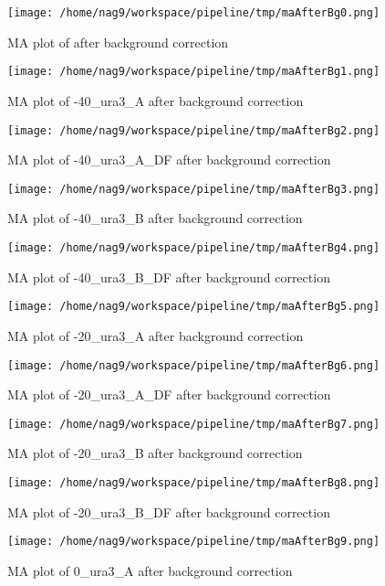 \documentclass[titlepage]{article}
\begin{document}
\begin{figure}[htb!]
\centering
\texttt{[image: /home/nag9/workspace/pipeline/tmp/maAfterBg0.png]}
\caption{MA plot of  after background correction}
\end{figure}\pagebreak
\begin{figure}[htb!]
\centering
\texttt{[image: /home/nag9/workspace/pipeline/tmp/maAfterBg1.png]}
\caption{MA plot of -40\_ura3\_A after background correction}
\end{figure}\pagebreak
\begin{figure}[htb!]
\centering
\texttt{[image: /home/nag9/workspace/pipeline/tmp/maAfterBg2.png]}
\caption{MA plot of -40\_ura3\_A\_DF after background correction}
\end{figure}\pagebreak
\begin{figure}[htb!]
\centering
\texttt{[image: /home/nag9/workspace/pipeline/tmp/maAfterBg3.png]}
\caption{MA plot of -40\_ura3\_B after background correction}
\end{figure}\pagebreak
\begin{figure}[htb!]
\centering
\texttt{[image: /home/nag9/workspace/pipeline/tmp/maAfterBg4.png]}
\caption{MA plot of -40\_ura3\_B\_DF after background correction}
\end{figure}\pagebreak
\begin{figure}[htb!]
\centering
\texttt{[image: /home/nag9/workspace/pipeline/tmp/maAfterBg5.png]}
\caption{MA plot of -20\_ura3\_A after background correction}
\end{figure}\pagebreak
\begin{figure}[htb!]
\centering
\texttt{[image: /home/nag9/workspace/pipeline/tmp/maAfterBg6.png]}
\caption{MA plot of -20\_ura3\_A\_DF after background correction}
\end{figure}\pagebreak
\begin{figure}[htb!]
\centering
\texttt{[image: /home/nag9/workspace/pipeline/tmp/maAfterBg7.png]}
\caption{MA plot of -20\_ura3\_B after background correction}
\end{figure}\pagebreak
\begin{figure}[htb!]
\centering
\texttt{[image: /home/nag9/workspace/pipeline/tmp/maAfterBg8.png]}
\caption{MA plot of -20\_ura3\_B\_DF after background correction}
\end{figure}\pagebreak
\begin{figure}[htb!]
\centering
\texttt{[image: /home/nag9/workspace/pipeline/tmp/maAfterBg9.png]}
\caption{MA plot of 0\_ura3\_A after background correction}
\end{figure}\pagebreak
\end{document}
